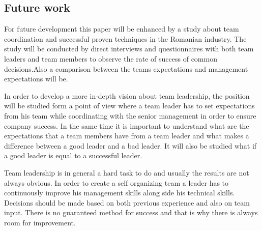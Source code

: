 \subsection{Future work}

For future development this paper will be enhanced by a study about team coordination and successful proven techniques in the Romanian industry. The study will be conducted by direct interviews and questionnaires with both team leaders and team members to observe the rate of success of common decisions.Also a comparison between the teams expectations and management expectations will be.

In order to develop a more in-depth vision about team leadership, the position will be studied form a point of view where a team leader has to set expectations from his team while coordinating with the senior management in order to ensure company success. In the same time it is important to understand what are the expectations that a team members have from a team leader and what makes a difference between a good leader and a bad leader. It will also be studied what if a good leader is equal to a successful leader.

Team leadership is in general a hard task to do and usually the results are not always obvious. In order to create a self organizing team a leader has to continuously improve his management skills along side his technical skills. Decisions should be made based on both previous experience and also on team input. There is no guaranteed method for success and that is why there is always room for improvement. 